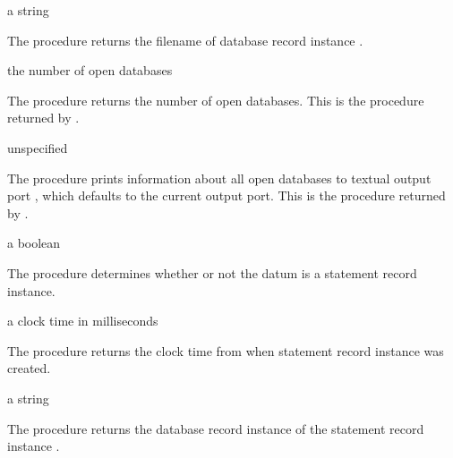 \begin{procedure}
\end{procedure}
\returns{} a string

The  procedure returns the filename of
database record instance .

\begin{procedure}
\end{procedure}
\returns{} the number of open databases

The  procedure returns the number of open
databases.
This is the procedure returned by .

\begin{procedure}
\end{procedure}
\returns{} unspecified

The  procedure prints information about all open
databases to textual output port , which defaults to the
current output port.
This is the procedure returned by .

\begin{procedure}
\end{procedure}
\returns{} a boolean

The  procedure determines whether or not the datum
 is a statement record instance.

\begin{procedure}
\end{procedure}
\returns{} a clock time in milliseconds

The  procedure returns the clock time from
 when statement record instance  was
created.

\begin{procedure}
\end{procedure}
\returns{} a string

The  procedure returns the database record
instance of the statement record instance .


